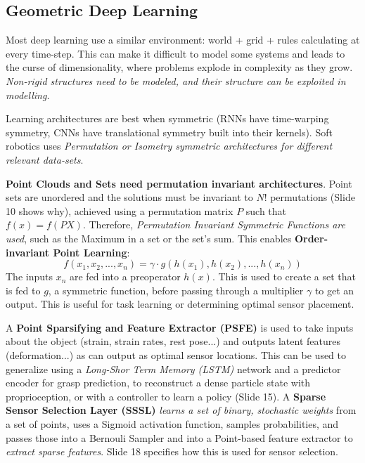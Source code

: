 \documentclass[onecolumn,a4paper]{article}
\begin{document}
\subsection{Geometric Deep Learning}
Most deep learning use a similar environment: world + grid + rules calculating at every time-step. This can make it difficult to model some systems and leads to the curse of dimensionality, where problems explode in complexity as they grow. \emph{Non-rigid structures need to be modeled, and their structure can be exploited in modelling.}

Learning architectures are best when symmetric (RNNs have time-warping symmetry, CNNs have translational symmetry built into their kernels). Soft robotics uses \emph{Permutation or Isometry symmetric architectures for different relevant data-sets}.

\textbf{Point Clouds and Sets need permutation invariant architectures}. Point sets are unordered and the solutions must be invariant to $N!$ permutations (Slide 10 shows why), achieved using a permutation matrix $P$ such that $f(x)=f(PX)$. Therefore, \emph{Permutation Invariant Symmetric Functions are used}, such as the Maximum in a set or the set's sum. This enables \textbf{Order-invariant Point Learning}:
\begin{equation}
    f(x_1, x_2, ..., x_n) = \gamma\cdot g(h(x_1), h(x_2),...,h(x_n))
\end{equation}
The inputs $x_n$ are fed into a preoperator $h(x)$. This is used to create a set that is fed to $g$, a symmetric function, before passing through a multiplier $\gamma$ to get an output. This is useful for task learning or determining optimal sensor placement.

A \textbf{Point Sparsifying and Feature Extractor (PSFE)} is used to take inputs about the object (strain, strain rates, rest pose...) and outputs latent features (deformation...) as can output as optimal sensor locations. This can be used to generalize using a \emph{Long-Shor Term Memory (LSTM)} network and a predictor encoder for grasp prediction, to reconstruct a dense particle state with proprioception, or with a controller to learn a policy (Slide 15). A \textbf{Sparse Sensor Selection Layer (SSSL)} \emph{learns a set of binary, stochastic weights} from a set of points, uses a Sigmoid activation function, samples probabilities, and passes those into a Bernouli Sampler and into a Point-based feature extractor to \emph{extract sparse features}. Slide 18 specifies how this is used for sensor selection.
\end{document}
